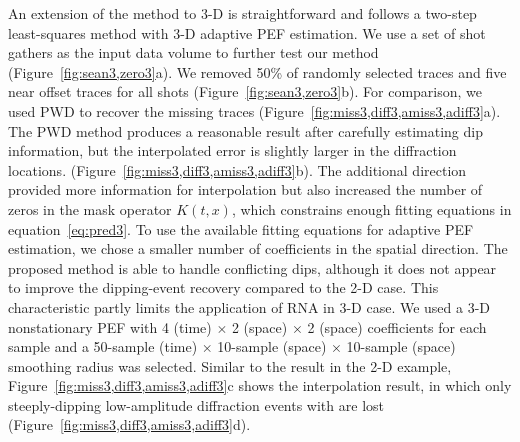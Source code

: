 An extension of the method to 3-D is straightforward and follows a
two-step least-squares method with 3-D adaptive PEF
estimation. We use a set of shot gathers as the input data volume to
further test our method (Figure~\ref{fig:sean3,zero3}a). We removed
50\% of randomly selected traces and five near offset traces for all
shots (Figure~\ref{fig:sean3,zero3}b). For comparison, we used
PWD to recover the missing traces
(Figure~\ref{fig:miss3,diff3,amiss3,adiff3}a). The PWD method produces
a reasonable result after carefully estimating dip information, but
the interpolated error is slightly larger in the diffraction
locations. (Figure~\ref{fig:miss3,diff3,amiss3,adiff3}b). The additional
direction provided more information for interpolation but also
increased the number of zeros in the mask operator $K(t,x)$, which
constrains enough fitting equations in equation~\ref{eq:pred3}. To use
the available fitting equations for adaptive PEF estimation, we chose
a smaller number of coefficients in the spatial direction. The
proposed method is able to handle conflicting dips, although it does
not appear to improve the dipping-event recovery compared to the 2-D
case. This characteristic partly limits the application of RNA in 3-D
case. We used a 3-D nonstationary PEF with 4 (time) $\times$ 2
(space) $\times$ 2 (space) coefficients for each sample and a
50-sample (time) $\times$ 10-sample (space) $\times$ 10-sample (space)
smoothing radius was selected. Similar to the result in the 2-D
example, Figure~\ref{fig:miss3,diff3,amiss3,adiff3}c shows the
interpolation result, in which only steeply-dipping low-amplitude
diffraction events with are lost
(Figure~\ref{fig:miss3,diff3,amiss3,adiff3}d).




